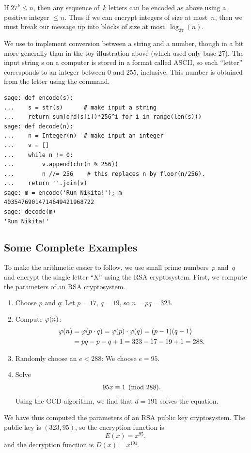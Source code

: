 If $27^k\leq n$, then any sequence of~$k$ letters can be encoded as above
using a positive integer $\leq n$.  Thus if we can encrypt integers
of size at most~$n$, then we must break our message up into blocks
of size at most~$\log_{27}(n)$.

\begin{sg}
  We use \sage to implement conversion between a string and a number,
  though in a bit more generally than in the toy illustration above
  (which used only base 27).  The input string s on a computer is
  stored in a format called ASCII, so each ``letter'' corresponds to
  an integer between $0$ and $255$, inclusive.  This number is
  obtained from the letter using the  command.
\begin{verbatim}
sage: def encode(s):
...    s = str(s)      # make input a string
...    return sum(ord(s[i])*256^i for i in range(len(s)))
sage: def decode(n):
...    n = Integer(n)  # make input an integer
...    v = []
...    while n != 0:
...        v.append(chr(n % 256))
...        n //= 256    # this replaces n by floor(n/256).
...    return ''.join(v)
sage: m = encode('Run Nikita!'); m
40354769014714649421968722
sage: decode(m)
'Run Nikita!'
\end{verbatim}
\end{sg}


\subsection{Some Complete Examples}
To make the arithmetic easier to follow, we use small prime numbers~$p$
and~$q$ and encrypt the single letter ``X'' using the RSA cryptosystem.
First, we compute the parameters of an RSA cryptosystem.
\begin{enumerate}
\item Choose $p$ and $q$: Let $p=17$, $q=19$, so $n=pq = 323$.
\item Compute $\varphi(n)$:
\begin{align*}
\varphi(n) &= \varphi(p\cdot q) =\varphi(p)\cdot\varphi(q) = (p-1)(q-1)\\
         &= pq-p-q+1 = 323-17-19+1 = 288.
\end{align*}
\item Randomly choose an $e<288$: We choose $e=95$.
\item Solve
$$
  95x \equiv 1\pmod{288}.
$$
Using the GCD algorithm, we find that $d=191$ solves
the equation.
\end{enumerate}

\noindent{}We have thus computed the parameters of an RSA public key cryptosystem.
The public key is $(323,95)$, so the encryption
function is %
$$
   E(x) = x^{95},
$$
and the decryption function is $D(x) = x^{191}$.

